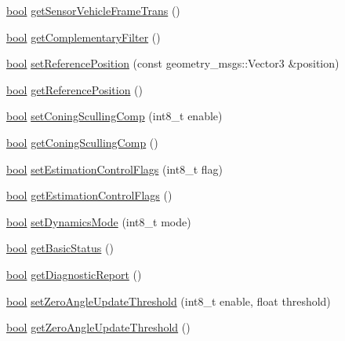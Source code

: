 \begin{DoxyCompactItemize}
\item 
\hyperlink{classbool}{bool} \hyperlink{classcl__microstrain__mips_1_1ClMicrostainMips_a184450cf337fe02c9ef4101520d9f9a5}{get\+Sensor\+Vehicle\+Frame\+Trans} ()
\item 
\hyperlink{classbool}{bool} \hyperlink{classcl__microstrain__mips_1_1ClMicrostainMips_aaff58eafdd41438a7af7c6adee3b2d5b}{get\+Complementary\+Filter} ()
\item 
\hyperlink{classbool}{bool} \hyperlink{classcl__microstrain__mips_1_1ClMicrostainMips_a2dae9cbd60e135e149117d6af14e6b27}{set\+Reference\+Position} (const geometry\+\_\+msgs\+::\+Vector3 \&position)
\item 
\hyperlink{classbool}{bool} \hyperlink{classcl__microstrain__mips_1_1ClMicrostainMips_a1bb67145e871d3ce3637a713559a0121}{get\+Reference\+Position} ()
\item 
\hyperlink{classbool}{bool} \hyperlink{classcl__microstrain__mips_1_1ClMicrostainMips_a981895d2724594166bcf22247382ddcf}{set\+Coning\+Sculling\+Comp} (int8\+\_\+t enable)
\item 
\hyperlink{classbool}{bool} \hyperlink{classcl__microstrain__mips_1_1ClMicrostainMips_a6826c989f0b2a29b87c6e78140dfe6d1}{get\+Coning\+Sculling\+Comp} ()
\item 
\hyperlink{classbool}{bool} \hyperlink{classcl__microstrain__mips_1_1ClMicrostainMips_a8b5a76095196ef5a351804991ea9e23f}{set\+Estimation\+Control\+Flags} (int8\+\_\+t flag)
\item 
\hyperlink{classbool}{bool} \hyperlink{classcl__microstrain__mips_1_1ClMicrostainMips_ad0a8eda5c19617250d3392593d0c8986}{get\+Estimation\+Control\+Flags} ()
\item 
\hyperlink{classbool}{bool} \hyperlink{classcl__microstrain__mips_1_1ClMicrostainMips_aaa5987561df8840ec12ca1eecb852ad9}{set\+Dynamics\+Mode} (int8\+\_\+t mode)
\item 
\hyperlink{classbool}{bool} \hyperlink{classcl__microstrain__mips_1_1ClMicrostainMips_a7ba22bfed70ee5796d9776b9438d0908}{get\+Basic\+Status} ()
\item 
\hyperlink{classbool}{bool} \hyperlink{classcl__microstrain__mips_1_1ClMicrostainMips_adbe8f64e2f6e4d48cd0efc84924b4d08}{get\+Diagnostic\+Report} ()
\item 
\hyperlink{classbool}{bool} \hyperlink{classcl__microstrain__mips_1_1ClMicrostainMips_a75ba5fe4116ece2f23f9f92f7ab96435}{set\+Zero\+Angle\+Update\+Threshold} (int8\+\_\+t enable, float threshold)
\item 
\hyperlink{classbool}{bool} \hyperlink{classcl__microstrain__mips_1_1ClMicrostainMips_afca57a1888e4e57f6dba69083e53442d}{get\+Zero\+Angle\+Update\+Threshold} ()

\end{DoxyCompactItemize}
